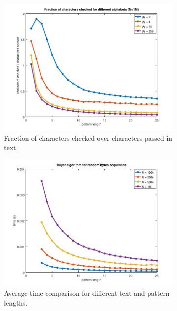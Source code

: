 \documentclass{article}
\begin{document}
\begin{figure}
  \centering
  \begin{subfigure}[b]{0.4\linewidth}
    \includegraphics[width=\linewidth]{boyer3.png}
     \caption{Fraction of characters checked over characters passed in text.}
  \end{subfigure}
  \begin{subfigure}[b]{0.4\linewidth}
    \includegraphics[width=\linewidth]{boyer1.png}
    \caption{Average time comparison for different text and pattern lengths.}
  \end{subfigure}
  \begin{subfigure}[b]{0.5\linewidth}

\end{subfigure}
\end{figure}
\end{document}
